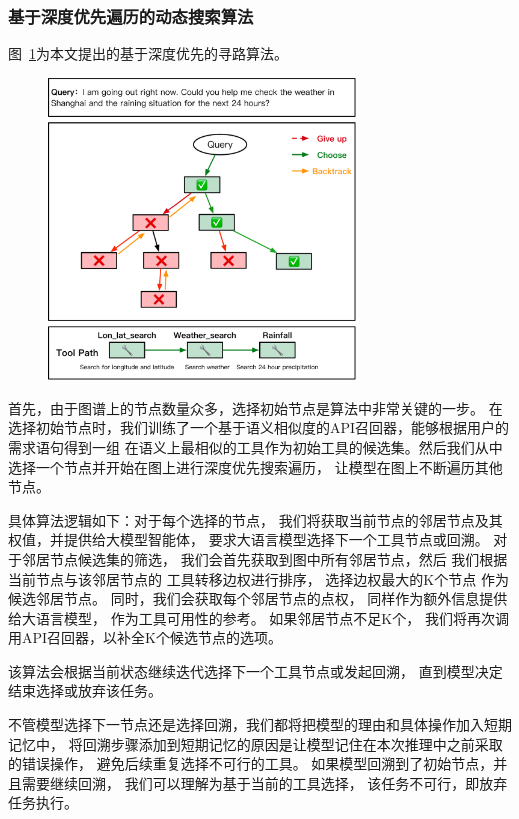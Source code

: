 \subsubsection{基于深度优先遍历的动态搜索算法}

图~\ref{fig:ch4-dfs}为本文提出的基于深度优先的寻路算法。

\begin{figure}[!htp]
  \vspace{1em}
  \centering
  \setlength{\abovecaptionskip}{10pt} %
  \includegraphics[height=8cm]{../assets/ch4-dfs算法.pdf}
  \label{fig:ch4-dfs}
\end{figure}

首先，由于图谱上的节点数量众多，选择初始节点是算法中非常关键的一步。
在选择初始节点时，我们训练了一个基于语义相似度的API召回器，能够根据用户的需求语句得到一组
在语义上最相似的工具作为初始工具的候选集。然后我们从中选择一个节点并开始在图上进行深度优先搜索遍历，
让模型在图上不断遍历其他节点。

具体算法逻辑如下：对于每个选择的节点，
我们将获取当前节点的邻居节点及其权值，并提供给大模型智能体，
要求大语言模型选择下一个工具节点或回溯。
对于邻居节点候选集的筛选，
我们会首先获取到图中所有邻居节点，然后
我们根据当前节点与该邻居节点的
工具转移边权进行排序，
选择边权最大的K个节点
作为候选邻居节点。
同时，我们会获取每个邻居节点的点权，
同样作为额外信息提供给大语言模型，
作为工具可用性的参考。
如果邻居节点不足K个，
我们将再次调用API召回器，以补全K个候选节点的选项。

该算法会根据当前状态继续迭代选择下一个工具节点或发起回溯，
直到模型决定结束选择或放弃该任务。

不管模型选择下一节点还是选择回溯，我们都将把模型的理由和具体操作加入短期记忆中，
将回溯步骤添加到短期记忆的原因是让模型记住在本次推理中之前采取的错误操作，
避免后续重复选择不可行的工具。
如果模型回溯到了初始节点，并且需要继续回溯，
我们可以理解为基于当前的工具选择，
该任务不可行，即放弃任务执行。


